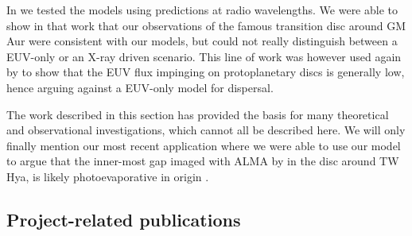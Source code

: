 \documentclass[10pt,fleqn,twoside]{article}
\begin{document}
In 
\citet{2013MNRAS.434.3378O}
we tested the models using
predictions at radio wavelengths. We were able to show in that work that our
observations of the famous transition disc around GM Aur were
consistent with our models, but could not really distinguish between
a EUV-only or an X-ray driven scenario. This line of work was however
used again by 
\citet{2014ApJ...795....1P}
to show that the EUV flux
impinging on protoplanetary discs is generally low, hence arguing
against a EUV-only model for dispersal. 

The work described in this section has provided the basis for many theoretical
and observational investigations, which cannot all be described
here. We will only finally mention our most recent application where
we were able to use our model to argue that the inner-most gap imaged
with ALMA by 
\citet{2016ApJ...820L..40A}
in the disc around TW Hya, is
likely photoevaporative in origin 
\citep{2017MNRAS.464L..95E}.


\subsection{Project-related publications}


\end{document}
